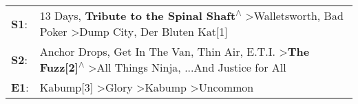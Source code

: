 \begin{supertabular}{p{0.03\textwidth}p{0.92\textwidth}}
 \textbf{S1}:  &                                       13 Days\textsuperscript{}, \enspace \textbf{Tribute to the Spinal Shaft\textsuperscript{$\wedge$}} \textgreater \enspace Walletsworth\textsuperscript{}, \enspace Bad Poker\textsuperscript{} \textgreater \enspace Dump City\textsuperscript{}, \enspace Der Bluten Kat[1]\textsuperscript{}  \enspace  \\
 \textbf{S2}:  &  Anchor Drops\textsuperscript{}, \enspace Get In The Van\textsuperscript{}, \enspace Thin Air\textsuperscript{}, \enspace E.T.I.\textsuperscript{} \textgreater \enspace \textbf{The Fuzz[2]\textsuperscript{$\wedge$}} \textgreater \enspace All Things Ninja\textsuperscript{}, \enspace ...And Justice for All\textsuperscript{}  \enspace  \\
 \textbf{E1}:  &                                                                                                                                                           Kabump[3]\textsuperscript{} \textgreater \enspace Glory\textsuperscript{} \textgreater \enspace Kabump\textsuperscript{} \textgreater \enspace Uncommon\textsuperscript{}  \enspace  \\
\end{supertabular}
